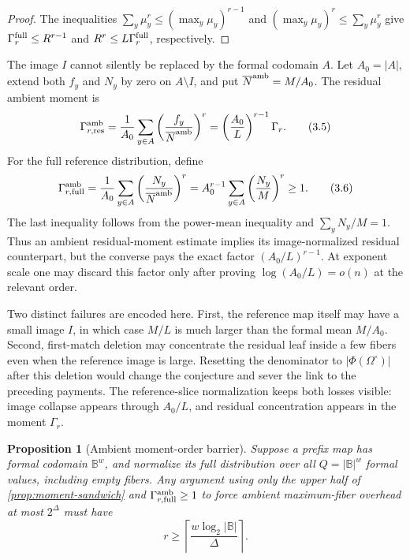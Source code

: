 \documentclass[a4paper,11pt]{amsart}
\newtheorem{proposition}[theorem]{Proposition}
\theoremstyle{remark}
\newcommand{\B}{\mathbb B}
\newcommand{\Om}{\Omega}
\newcommand{\barN}{\overline N}
\newcommand{\abs}[1]{\lvert#1\rvert}
\newcommand{\ceil}[1]{\left\lceil#1\right\rceil}
\begin{document}
\begin{proof}
The inequalities
\(\sum_y\mu_y^r\le(\max_y\mu_y)^{r-1}\) and
\((\max_y\mu_y)^r\le\sum_y\mu_y^r\) give
\(\Gamma_r^{\rm full}\le R^{r-1}\) and
\(R^r\le L\Gamma_r^{\rm full}\), respectively.
\end{proof}

The image \(I\) cannot silently be replaced by the formal codomain \(A\).
Let \(A_0=\abs A\), extend both \(f_y\) and \(N_y\) by zero on
\(A\setminus I\), and put \(\barN^{\rm amb}=M/A_0\).  The residual ambient
moment is
\[
 \Gamma_{r,\mathrm{res}}^{\rm amb}
 =\frac1{A_0}\sum_{y\in A}
   \left(\frac{f_y}{\barN^{\rm amb}}\right)^r
 =\left(\frac{A_0}{L}\right)^{r-1}\Gamma_r.       \tag{3.5}\label{eq:ambient-image}
\]
For the full reference distribution, define
\[
 \Gamma_{r,\mathrm{full}}^{\rm amb}
 =\frac1{A_0}\sum_{y\in A}
   \left(\frac{N_y}{\barN^{\rm amb}}\right)^r
 =A_0^{r-1}\sum_{y\in A}\left(\frac{N_y}{M}\right)^r\ge1. \tag{3.6}\label{eq:ambient-full}
\]
The last inequality follows from the power-mean inequality and
\(\sum_yN_y/M=1\).  Thus an ambient residual-moment estimate implies its
image-normalized residual counterpart, but the converse pays the exact
factor \((A_0/L)^{r-1}\).  At exponent scale one may discard this factor
only after proving \(\log(A_0/L)=o(n)\) at the relevant order.

Two distinct failures are encoded here.  First, the reference map itself may
have a small image \(I\), in which case \(M/L\) is much larger than the
formal mean \(M/A_0\).  Second, first-match deletion may concentrate the
residual leaf inside a few fibers even when the reference image is large.
Resetting the denominator to \(\abs{\Phi(\Om^\circ)}\) after this deletion
would change the conjecture and sever the link to the preceding payments.
The reference-slice normalization keeps both losses visible: image collapse
appears through \(A_0/L\), and residual concentration appears in the moment
\(\Gamma_r\).

\begin{proposition}[Ambient moment-order barrier]\label{prop:ambient-order}
Suppose a prefix map has formal codomain \(\B^w\), and normalize its full
distribution over all \(Q=\abs{\B}^w\) formal values, including empty fibers.
Any argument using only the upper half of \cref{prop:moment-sandwich} and
\(\Gamma_{r,\mathrm{full}}^{\rm amb}\ge1\) to force ambient maximum-fiber overhead at most
\(2^\Delta\) must have
\[
 r\ge\ceil{\frac{w\log_2\abs\B}{\Delta}}.          \tag{3.7}\label{eq:order-floor}
\]
\end{proposition}
\end{document}
